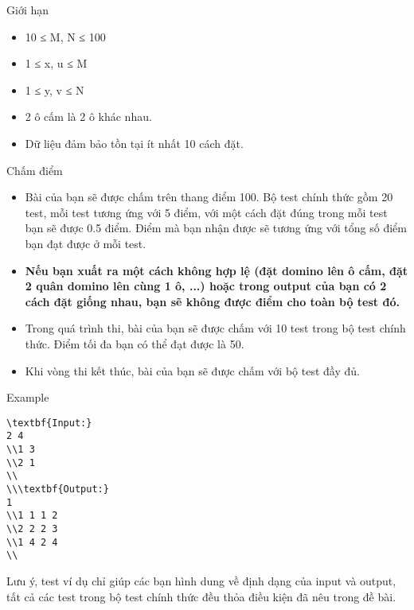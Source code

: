 Giới hạn  
\begin{itemize}
	\item     10 ≤ M, N ≤ 100   
	\item     1 ≤ x, u ≤ M   
	\item     1 ≤ y, v ≤ N   
	\item     2 ô cấm là 2 ô khác nhau.   
	\item     Dữ liệu đảm bảo tồn tại ít nhất 10 cách đặt.   
\end{itemize}
   Chấm điểm  
\begin{itemize}
	\item     Bài của bạn sẽ được chấm trên thang điểm 100. Bộ test chính thức gồm 20 test, mỗi test tương ứng với 5 điểm, với một cách đặt đúng trong mỗi test bạn sẽ được 0.5 điểm. Điểm mà bạn nhận được sẽ tương ứng với tổng số điểm bạn đạt được ở mỗi test.   
	\item \textbf{     Nếu bạn xuất ra một cách không hợp lệ (đặt domino lên ô cấm, đặt 2  quân domino lên cùng 1 ô, ...) hoặc trong output của bạn có 2 cách đặt  giống nhau, bạn sẽ không được điểm cho toàn bộ test đó.    }
	\item     Trong quá trình thi, bài của bạn sẽ được chấm với 10 test trong bộ test chính thức. Điểm tối đa bạn có thể đạt được là 50.   
	\item     Khi vòng thi kết thúc, bài của bạn sẽ được chấm với bộ test đầy đủ.   
\end{itemize}
\begin{itemize}
\end{itemize}
\begin{itemize}
\end{itemize}
   Example  
\begin{verbatim}
\textbf{Input:}
2 4
\\1 3
\\2 1
\\
\\\textbf{Output:}
1
\\1 1 1 2
\\2 2 2 3
\\1 4 2 4
\\\end{verbatim}

   Lưu ý, test ví dụ chỉ giúp các bạn hình dung về định dạng của input và output, tất cả các test trong bộ test chính thức đều thỏa điều kiện đã nêu trong đề bài.